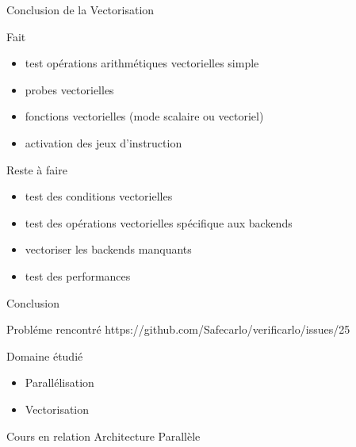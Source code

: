 \documentclass{beamer}
\begin{document}
\begin{frame}{Conclusion de la Vectorisation}

  \begin{block}{Fait}
    \begin{itemize}
    \item test opérations arithmétiques vectorielles simple
    \item probes vectorielles
    \item fonctions vectorielles (mode scalaire ou vectoriel)
    \item activation des jeux d'instruction
    \end{itemize}
  \end{block}

  \begin{alertblock}{Reste à faire}
    \begin{itemize}
    \item test des conditions vectorielles
    \item test des opérations vectorielles spécifique aux backends
    \item vectoriser les backends manquants
    \item test des performances
    \end{itemize}
  \end{alertblock}

\end{frame}

\begin{frame}{Conclusion}

  \begin{block}{Probléme rencontré}
    https://github.com/Safecarlo/verificarlo/issues/25
  \end{block}

  \begin{block}{Domaine étudié}
    \begin{itemize}
    \item Parallélisation
    \item Vectorisation
    \end{itemize}
  \end{block}
  
  \begin{block}{Cours en relation}
    Architecture Parallèle
  \end{block}

\end{frame}
 
\end{document}
